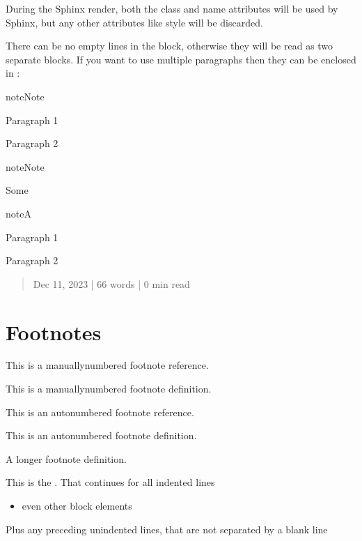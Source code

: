 \documentclass[letterpaper,10pt,english]{jupyterBook}
\begin{document}
\sphinxAtStartPar
During the Sphinx render, both the class and name attributes will be used by Sphinx, but any other attributes like style will be discarded.

\sphinxAtStartPar
There can be no empty lines in the block, otherwise they will be read as two separate blocks. If you want to use multiple paragraphs then they can be enclosed in :

\begin{sphinxadmonition}{note}{Note}

\sphinxAtStartPar
Paragraph 1

\sphinxAtStartPar
Paragraph 2
\end{sphinxadmonition}

\begin{sphinxadmonition}{note}{Note}

\sphinxAtStartPar
Some 

\begin{sphinxadmonition}{note}{A }

\sphinxAtStartPar
Paragraph 1

\sphinxAtStartPar
Paragraph 2
\end{sphinxadmonition}
\end{sphinxadmonition}

\sphinxstepscope
\begin{quote}

\sphinxAtStartPar
Dec 11, 2023 | 66 words | 0 min read
\end{quote}


\section{Footnotes}
\label{\detokenize{docs/02_02_Footnotes:footnotes}}\label{\detokenize{docs/02_02_Footnotes::doc}}
\sphinxAtStartPar
This is a manually\sphinxhyphen{}numbered footnote reference.%
\begin{footnote}[3]\sphinxAtStartFootnote
This is a manually\sphinxhyphen{}numbered footnote definition.
%
\end{footnote}

\sphinxAtStartPar
This is an auto\sphinxhyphen{}numbered footnote reference.%
\begin{footnote}[1]\sphinxAtStartFootnote
This is an auto\sphinxhyphen{}numbered footnote definition.
%
\end{footnote}

\sphinxAtStartPar
A longer footnote definition.%
\begin{footnote}[2]\sphinxAtStartFootnote
This is the .
That continues for all indented lines
\begin{itemize}
\item {} 
\sphinxAtStartPar
even other block elements

\end{itemize}

\sphinxAtStartPar
Plus any preceding unindented lines, that are not separated by a blank line
%
\end{footnote}
\end{document}
